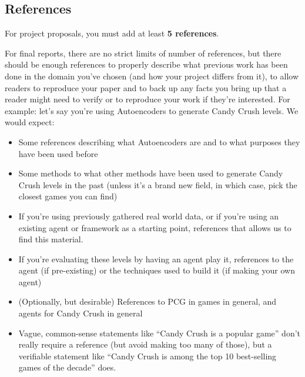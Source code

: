 \documentclass[conference]{IEEEtran}
\begin{document}
\subsection{References}

For project proposals, you must add at least \textbf{5 references}.

For final reports, there are no strict limits of number of references, but there should be enough references to properly describe what previous work has been done in the domain you've chosen (and how your project differs from it), to allow readers to reproduce your paper and to back up any facts you bring up that a reader might need to verify or to reproduce your work if they're interested.
For example: let's say you're using Autoencoders to generate Candy Crush levels. We would expect:
\begin{itemize}
    \item Some references describing what Autoencoders are and to what purposes they have been used before
    \item Some methods to what other methods have been used to generate Candy Crush levels in the past (unless it's a brand new field, in which case, pick the closest games you can find)
    \item If you're using previously gathered real world data, or if you're using an existing agent or framework as a starting point,  references that allows us to find this material.
    \item  If you're evaluating these levels by having an agent play it, references to the agent (if pre-existing) or the techniques used to build it (if making your own agent)
    \item (Optionally, but desirable) References to PCG in games in general, and agents for Candy Crush in general
    \item Vague, common-sense statements like ``Candy Crush is a popular game'' don't really require a reference (but avoid making too many of those), but a verifiable statement like ``Candy Crush is among the top 10 best-selling games of the decade'' does.
\end{itemize}



\end{document}

